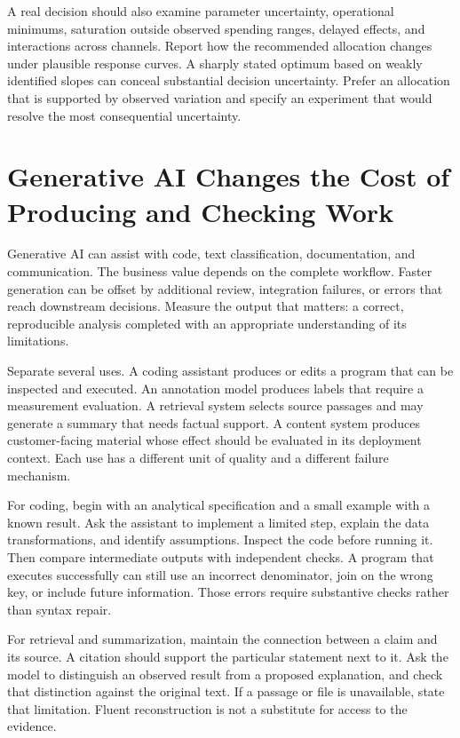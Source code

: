 A real decision should also examine parameter uncertainty, operational
minimums, saturation outside observed spending ranges, delayed effects,
and interactions across channels. Report how the recommended allocation
changes under plausible response curves. A sharply stated optimum based
on weakly identified slopes can conceal substantial decision
uncertainty. Prefer an allocation that is supported by observed
variation and specify an experiment that would resolve the most
consequential uncertainty.

\hypertarget{M08-generative-ai-changes-the-cost-of-producing-and-checking-work}{%
\section{Generative AI Changes the Cost of Producing and Checking
Work}\label{M08-generative-ai-changes-the-cost-of-producing-and-checking-work}}

\noindent Generative AI can assist with code, text classification, documentation,
and communication. The business value depends on the complete workflow.
Faster generation can be offset by additional review, integration
failures, or errors that reach downstream decisions. Measure the output
that matters: a correct, reproducible analysis completed with an
appropriate understanding of its limitations.

Separate several uses. A coding assistant produces or edits a program
that can be inspected and executed. An annotation model produces labels
that require a measurement evaluation. A retrieval system selects source
passages and may generate a summary that needs factual support. A
content system produces customer-facing material whose effect should be
evaluated in its deployment context. Each use has a different unit of
quality and a different failure mechanism.

For coding, begin with an analytical specification and a small example
with a known result. Ask the assistant to implement a limited step,
explain the data transformations, and identify assumptions. Inspect the
code before running it. Then compare intermediate outputs with
independent checks. A program that executes successfully can still use
an incorrect denominator, join on the wrong key, or include future
information. Those errors require substantive checks rather than syntax
repair.

For retrieval and summarization, maintain the connection between a claim
and its source. A citation should support the particular statement next
to it. Ask the model to distinguish an observed result from a proposed
explanation, and check that distinction against the original text. If a
passage or file is unavailable, state that limitation. Fluent
reconstruction is not a substitute for access to the evidence.

